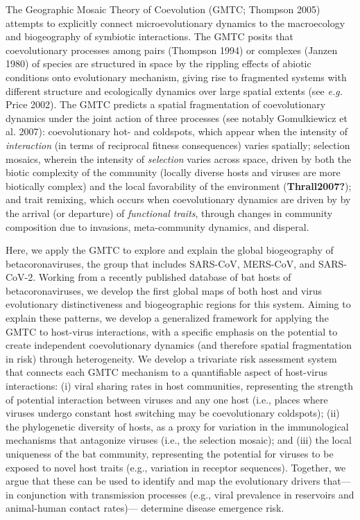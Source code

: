 \documentclass[11pt]{article}
\begin{document}
The Geographic Mosaic Theory of Coevolution (GMTC; Thompson 2005)
attempts to explicitly connect microevolutionary dynamics to the
macroecology and biogeography of symbiotic interactions. The GMTC posits
that coevolutionary processes among pairs (Thompson 1994) or complexes
(Janzen 1980) of species are structured in space by the rippling effects
of abiotic conditions onto evolutionary mechanism, giving rise to
fragmented systems with different structure and ecologically dynamics
over large spatial extents (see \emph{e.g.} Price 2002). The GMTC
predicts a spatial fragmentation of coevolutionary dynamics under the
joint action of three processes (see notably Gomulkiewicz et al. 2007):
coevolutionary hot- and coldspots, which appear when the intensity of
\emph{interaction} (in terms of reciprocal fitness consequences) varies
spatially; selection mosaics, wherein the intensity of \emph{selection}
varies across space, driven by both the biotic complexity of the
community (locally diverse hosts and viruses are more biotically
complex) and the local favorability of the environment
(\textbf{Thrall2007?}); and trait remixing, which occurs when
coevolutionary dynamics are driven by by the arrival (or departure) of
\emph{functional traits}, through changes in community composition due
to invasions, meta-community dynamics, and disperal.

Here, we apply the GMTC to explore and explain the global biogeography
of betacoronaviruses, the group that includes SARS-CoV, MERS-CoV, and
SARS-CoV-2. Working from a recently published database of bat hosts of
betacoronaviruses, we develop the first global maps of both host and
virus evolutionary distinctiveness and biogeographic regions for this
system. Aiming to explain these patterns, we develop a generalized
framework for applying the GMTC to host-virus interactions, with a
specific emphasis on the potential to create independent coevolutionary
dynamics (and therefore spatial fragmentation in risk) through
heterogeneity. We develop a trivariate risk assessment system that
connects each GMTC mechanism to a quantifiable aspect of host-virus
interactions: (i) viral sharing rates in host communities, representing
the strength of potential interaction between viruses and any one host
(i.e., places where viruses undergo constant host switching may be
coevolutionary coldspots); (ii) the phylogenetic diversity of hosts, as
a proxy for variation in the immunological mechanisms that antagonize
viruses (i.e., the selection mosaic); and (iii) the local uniqueness of
the bat community, representing the potential for viruses to be exposed
to novel host traits (e.g., variation in receptor sequences). Together,
we argue that these can be used to identify and map the evolutionary
drivers that---in conjunction with transmission processes (e.g., viral
prevalence in reservoirs and animal-human contact rates)--- determine
disease emergence risk.
\end{document}
